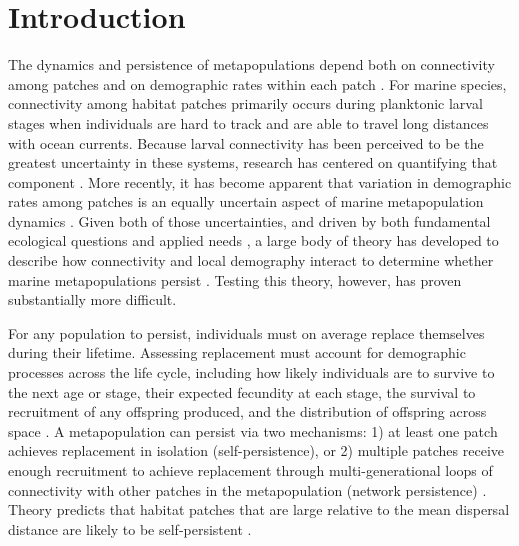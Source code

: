 \documentclass[12pt, oneside]{article}   	%
\begin{document}

\linenumbers{}
\modulolinenumbers[3]

\section*{Introduction} 

The dynamics and persistence of metapopulations depend both on connectivity among patches and on demographic rates within each patch \citep{hastings_persistence_2006, hanski1998metapopulation}. For marine species, connectivity among habitat patches primarily occurs during planktonic larval stages when individuals are hard to track and are able to travel long distances with ocean currents. Because larval connectivity has been perceived to be the greatest uncertainty in these systems, research has centered on quantifying that component \citep[reviewed by][]{white2019connectivity}. More recently, it has become apparent that variation in demographic rates among patches is an equally uncertain aspect of marine metapopulation dynamics \citep{hameed2016inverse, white2011oceanographic}. Given both of those uncertainties, and driven by both fundamental ecological questions and applied needs \citep{botsford_dependence_2001,white_population_2010}, a large body of theory has developed to describe how connectivity and local demography interact to determine whether marine metapopulations persist \citep{burgess2014beyond, botsford2019population}. Testing this theory, however, has proven substantially more difficult.

For any population to persist, individuals must on average replace themselves during their lifetime. Assessing replacement must account for demographic processes across the life cycle, including how likely individuals are to survive to the next age or stage, their expected fecundity at each stage, the survival to recruitment of any offspring produced, and the distribution of offspring across space \citep{hastings_persistence_2006}. A metapopulation can persist via two mechanisms: 1) at least one patch achieves replacement in isolation (self-persistence), or 2) multiple patches receive enough recruitment to achieve replacement through multi-generational loops of connectivity with other patches in the metapopulation (network persistence) \citep{hastings_persistence_2006, burgess2014beyond}. Theory predicts that habitat patches that are large relative to the mean dispersal distance are likely to be self-persistent \citep{white_population_2010}. %
\end{document}

